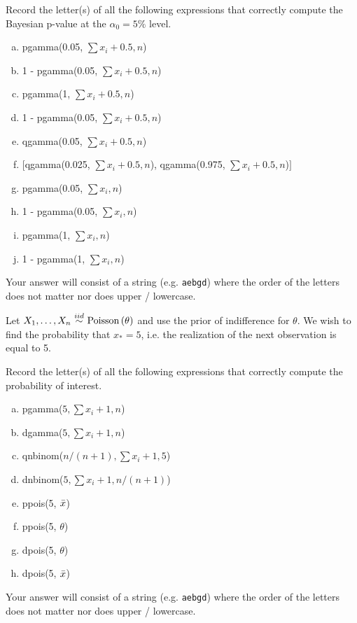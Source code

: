 \documentclass[12pt]{article}
\newcommand{\instr}{Your answer will consist of a string (e.g. \texttt{aebgd}) where the order of the letters does not matter nor does upper / lowercase.}
\begin{document}
\benum

 Record the letter(s) of all the following expressions that correctly compute the Bayesian p-value at the $\alpha_0 = 5\%$ level.


\begin{enumerate}[(a)]
\item pgamma(0.05, $\sum x_i + 0.5, n$)
\item 1 - pgamma(0.05, $\sum x_i + 0.5, n$)
\item pgamma(1, $\sum x_i + 0.5, n$)
\item 1 - pgamma(0.05, $\sum x_i + 0.5, n$)
\item qgamma(0.05, $\sum x_i + 0.5, n$)
\item $[$qgamma(0.025, $\sum x_i + 0.5, n$), qgamma(0.975, $\sum x_i + 0.5, n$)$]$
\item pgamma(0.05, $\sum x_i, n$)
\item 1 - pgamma(0.05, $\sum x_i , n$)
\item pgamma(1, $\sum x_i, n$)
\item 1 - pgamma(1, $\sum x_i, n$)
\end{enumerate}
\eenum\instr\pagebreak


\problem [8min] Let $\Xoneton \iid \poisson{\theta}$ and use the prior of indifference for $\theta$. We wish to find the probability that $x_* = 5$, i.e. the realization of the next observation is equal to 5.

\benum

 Record the letter(s) of all the following expressions that correctly compute the probability of interest.


\begin{enumerate}[(a)]
\item pgamma($5, \sum x_i + 1, n$)
\item dgamma($5, \sum x_i + 1, n$)
\item qnbinom($n / (n + 1), \sum x_i + 1, 5$)
\item dnbinom($5, \sum x_i + 1, n / (n + 1)$)
\item ppois(5, $\bar{x}$)
\item ppois(5, $\theta$)
\item dpois(5, $\theta$)
\item dpois(5, $\bar{x}$)
\end{enumerate}
\eenum\instr\pagebreak


\end{document}
